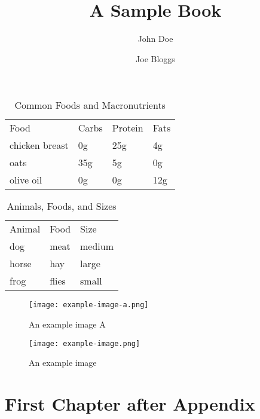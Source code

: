 \documentclass{book}
\title{A Sample Book}
\author{John Doe \and Joe Bloggs}
\begin{document}
\frontmatter


\mainmatter


\begin{table}
    \begin{tabular}{llll}
    	Food           & Carbs & Protein & Fats \\
    	chicken breast &    0g & 25g     & 4g \\
    	oats           &   35g & 5g      & 0g \\
    	olive oil      &    0g & 0g      & 12g \\
    \end{tabular}
    \caption{Common Foods and Macronutrients}
\end{table}    

\begin{table}
    \begin{tabular}{lll}
      Animal & Food  & Size   \\
      dog    & meat  & medium \\
      horse  & hay   & large  \\
      frog   & flies & small  \\
    \end{tabular}
    \caption{Animals, Foods, and Sizes}
\end{table}



\begin{figure}[hp]
	\centering
	\texttt{[image: example-image-a.png]}
	\caption{An example image A}
\end{figure}

\begin{figure}[ht]
	\centering
	\texttt{[image: example-image.png]}
	\caption{An example image}
\end{figure}

\appendix

\chapter{First Chapter after Appendix}
\listoftables
\listoffigures


\backmatter
\printbibliography
\newpage

\end{document}

